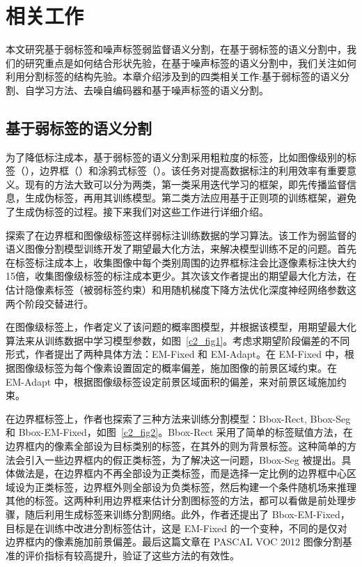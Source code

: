 \chapter{相关工作}
本文研究基于弱标签和噪声标签弱监督语义分割，在基于弱标签的语义分割中，我们的研究重点是如何结合形状先验，在基于噪声标签的语义分割中，我们关注如何利用分割标签的结构先验。本章介绍涉及到的四类相关工作:基于弱标签的语义分割、自学习方法、去噪自编码器和基于噪声标签的语义分割。

\section{基于弱标签的语义分割}
为了降低标注成本，基于弱标签的语义分割采用粗粒度的标签，比如图像级别的标签（\cite{wang2020self,fan2020learning,chang2020weakly}），边界框（\cite{papandreou2015weakly,khoreva2017simple,song2019box}）和涂鸦式标签（\cite{lin2016scribblesup,vernaza2017learning,tang2018regularized}）。该任务对提高数据标注的利用效率有重要意义。现有的方法大致可以分为两类，第一类采用迭代学习的框架，即先传播监督信息，生成伪标签，再用其训练模型。第二类方法应用基于正则项的训练框架，避免了生成伪标签的过程。接下来我们对这些工作进行详细介绍。


\citet{papandreou2015weakly}探索了在边界框和图像级标签这样弱标注训练数据的学习算法。该工作为弱监督的语义图像分割模型训练开发了期望最大化方法，来解决模型训练不足的问题。首先在标签标注成本上，收集图像中每个类别周围的边界框标注会比逐像素标注快大约15倍\citep{lin2014microsoft}，收集图像级标签的标注成本更少。其次该文作者提出的期望最大化方法，在估计隐像素标签（被弱标签约束）和用随机梯度下降方法优化深度神经网络参数这两个阶段交替进行。

在图像级标签上，作者定义了该问题的概率图模型，并根据该模型，用期望最大化算法来从训练数据中学习模型参数，如图~\ref{c2_fig1}。考虑求期望阶段偏差的不同形式，作者提出了两种具体方法：EM-Fixed 和 EM-Adapt。在 EM-Fixed 中，根据图像级标签为每个像素设置固定的概率偏差，施加图像的前景区域约束。在 EM-Adapt 中，根据图像级标签设定前景区域面积的偏差，来对前景区域施加约束。

在边界框标签上，作者也探索了三种方法来训练分割模型：Bbox-Rect, Bbox-Seg 和 Bbox-EM-Fixed，如图~\ref{c2_fig2}。Bbox-Rect 采用了简单的标签赋值方法，在边界框内的像素全部设为目标类别的标签，在其外的则为背景标签。这种简单的方法会引入一些边界框内的假正类标签，为了解决这一问题，Bbox-Seg 被提出。具体做法是，在边界框内不再全部设为正类标签，而是选择一定比例的边界框中心区域设为正类标签，边界框外则全部设为负类标签，然后构建一个条件随机场来推理其他的标签。这两种利用边界框来估计分割图标签的方法，都可以看做是前处理步骤，随后利用生成标签来训练分割网络。此外，作者还提出了 Bbox-EM-Fixed，目标是在训练中改进分割标签估计，这是 EM-Fixed 的一个变种，不同的是仅对边界框内的像素施加前景偏差。最后这篇文章在 PASCAL VOC 2012 图像分割基准的评价指标有较高提升，验证了这些方法的有效性。


